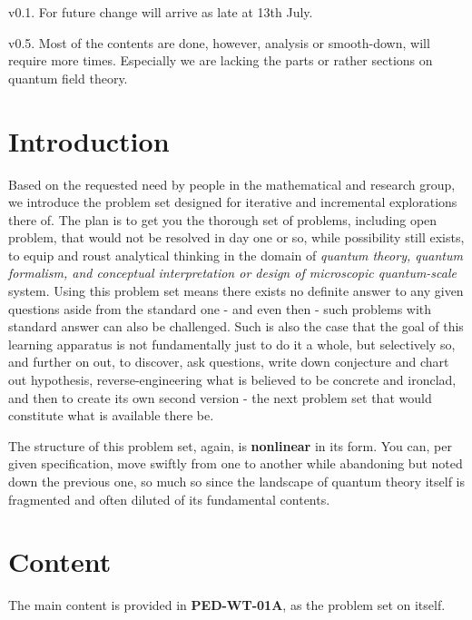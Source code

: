 \documentclass[10pt,a4paper]{article}
\begin{document}
v0.1. For future change will arrive as late at 13th July. 

v0.5. Most of the contents are done, however, analysis or smooth-down, will require more times. Especially we are lacking the parts or rather sections on quantum field theory. 

\section{Introduction}

Based on the requested need by people in the mathematical and research group, we introduce the problem set designed for iterative and incremental explorations there of. The plan is to get you the thorough set of problems, including open problem, that would not be resolved in day one or so, while possibility still exists, to equip and roust analytical thinking in the domain of \textit{quantum theory, quantum formalism, and conceptual interpretation or design of microscopic quantum-scale} system. Using this problem set means there exists no definite answer to any given questions aside from the standard one - and even then - such problems with standard answer can also be challenged. Such is also the case that the goal of this learning apparatus is not fundamentally just to do it a whole, but selectively so, and further on out, to discover, ask questions, write down conjecture and chart out hypothesis, reverse-engineering what is believed to be concrete and ironclad, and then to create its own second version - the next problem set that would constitute what is available there be. 

The structure of this problem set, again, is \textbf{nonlinear} in its form. You can, per given specification, move swiftly from one to another while abandoning but noted down the previous one, so much so since the landscape of quantum theory itself is fragmented and often diluted of its fundamental contents. 

\section{Content}

The main content is provided in \textbf{PED-WT-01A}, as the problem set on itself. 







\end{document}
